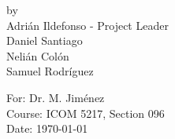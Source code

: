 \begin{titlepage}
\begin{center}
by \\[0.5cm]

Adri\'{a}n Ildefonso - Project Leader \\
Daniel Santiago \\
Neli\'{a}n Col\'{o}n \\
Samuel Rodr\'{i}guez \\

\vfill

For: Dr. M. Jim\'{e}nez \\
Course: ICOM 5217, Section 096 \\
Date: \today






\end{center}

\end{titlepage}
